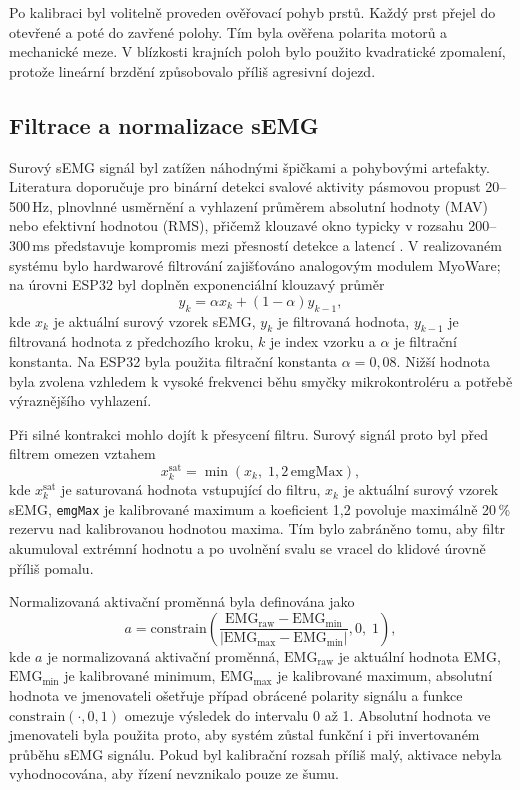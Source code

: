 \documentclass[FZS,DP]{tulthesis}
\begin{document}
Po kalibraci byl volitelně proveden ověřovací pohyb prstů. Každý prst přejel do otevřené a poté do zavřené polohy. Tím byla ověřena polarita motorů a mechanické meze. V blízkosti krajních poloh bylo použito kvadratické zpomalení, protože lineární brzdění způsobovalo příliš agresivní dojezd.

\subsection{Filtrace a normalizace sEMG}
\label{subsec:filtrace-semgg}

Surový sEMG signál byl zatížen náhodnými špičkami a pohybovými artefakty. Literatura doporučuje pro binární detekci svalové aktivity pásmovou propust 20--500\,Hz, plnovlnné usměrnění a vyhlazení průměrem absolutní hodnoty (MAV) nebo efektivní hodnotou (RMS), přičemž klouzavé okno typicky v rozsahu 200--300\,ms představuje kompromis mezi přesností detekce a latencí \cite{Chowdhury2013917,Hassan2019,Sul2025627}. V realizovaném systému bylo hardwarové filtrování zajišťováno analogovým modulem MyoWare; na úrovni ESP32 byl doplněn exponenciální klouzavý průměr
\begin{equation}
    y_k = \alpha x_k + \left(1 - \alpha\right)y_{k-1},
\end{equation}
kde $x_k$ je aktuální surový vzorek sEMG, $y_k$ je filtrovaná hodnota,
$y_{k-1}$ je filtrovaná hodnota z předchozího kroku, $k$ je index vzorku
a $\alpha$ je filtrační konstanta.
Na ESP32 byla použita filtrační konstanta $\alpha = 0{,}08$. Nižší hodnota byla zvolena vzhledem k vysoké frekvenci běhu smyčky mikrokontroléru a potřebě výraznějšího vyhlazení.

Při silné kontrakci mohlo dojít k přesycení filtru. Surový signál proto byl před filtrem omezen vztahem
\begin{equation}
    x_k^{\mathrm{sat}} = \min\left(x_k,\;1{,}2\,\mathrm{emgMax}\right),
\end{equation}
kde $x_k^{\mathrm{sat}}$ je saturovaná hodnota vstupující do filtru,
$x_k$ je aktuální surový vzorek sEMG, \texttt{emgMax} je kalibrované
maximum a koeficient 1{,}2 povoluje maximálně 20\,\% rezervu nad
kalibrovanou hodnotou maxima.
Tím bylo zabráněno tomu, aby filtr akumuloval extrémní hodnotu a po uvolnění svalu se vracel do klidové úrovně příliš pomalu.

Normalizovaná aktivační proměnná byla definována jako
\begin{equation}
    a = \mathrm{constrain}\!\left(
        \frac{\mathrm{EMG}_{\mathrm{raw}} - \mathrm{EMG}_{\min}}
             {\left|\mathrm{EMG}_{\max} - \mathrm{EMG}_{\min}\right|},
        0,\;1
    \right),
\end{equation}
kde $a$ je normalizovaná aktivační proměnná, $\mathrm{EMG}_{\mathrm{raw}}$
je aktuální hodnota EMG, $\mathrm{EMG}_{\min}$ je kalibrované minimum,
$\mathrm{EMG}_{\max}$ je kalibrované maximum, absolutní hodnota ve
jmenovateli ošetřuje případ obrácené polarity signálu a funkce
$\mathrm{constrain}(\cdot,0,1)$ omezuje výsledek do intervalu 0 až 1.
Absolutní hodnota ve jmenovateli byla použita proto, aby systém zůstal funkční i při invertovaném průběhu sEMG signálu. Pokud byl kalibrační rozsah příliš malý, aktivace nebyla vyhodnocována, aby řízení nevznikalo pouze ze šumu.
\end{document}
